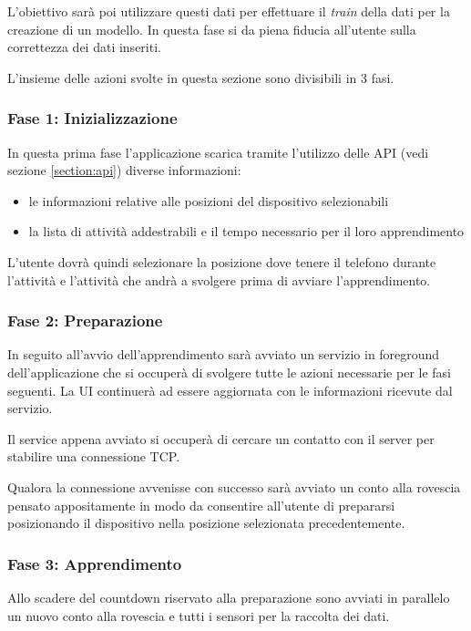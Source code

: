 L'obiettivo sarà poi utilizzare questi dati per effettuare il \textit{train} della dati per la creazione di un modello. In questa fase si da 
piena fiducia all'utente sulla correttezza dei dati inseriti.

L'insieme delle azioni svolte in questa sezione sono divisibili in 3 fasi.

\subsubsection{Fase 1: Inizializzazione}
In questa prima fase l'applicazione scarica tramite l'utilizzo delle API (vedi sezione \ref{section:api}) diverse informazioni:
\begin{itemize}
    \item le informazioni relative alle posizioni del dispositivo selezionabili
    \item la lista di attività addestrabili e il tempo necessario per il loro apprendimento
\end{itemize}

L'utente dovrà quindi selezionare la posizione dove tenere il telefono durante l'attività e l'attività che andrà a svolgere 
prima di avviare l'apprendimento.

\subsubsection{Fase 2: Preparazione}
In seguito all'avvio dell'apprendimento sarà avviato un servizio in foreground \cite{services} dell'applicazione che si occuperà di svolgere 
tutte le azioni necessarie per le fasi seguenti. La UI continuerà ad essere aggiornata con le informazioni ricevute dal servizio.

Il service appena avviato si occuperà di cercare un contatto con il server per stabilire una connessione TCP.

Qualora la connessione avvenisse con successo sarà avviato un conto alla rovescia pensato appositamente in modo da consentire all'utente 
di prepararsi posizionando il dispositivo nella posizione selezionata precedentemente.

\subsubsection{Fase 3: Apprendimento}
Allo scadere del countdown riservato alla preparazione sono avviati in parallelo un nuovo conto alla rovescia 
e tutti i sensori  per la raccolta dei dati.

